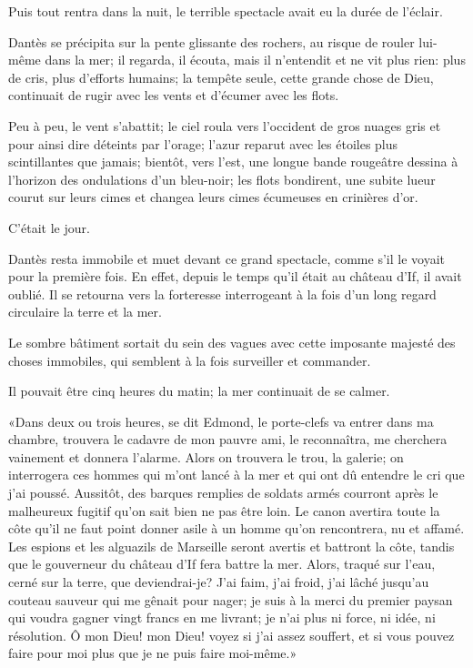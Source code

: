 Puis tout rentra dans la nuit, le terrible spectacle avait eu la durée de l'éclair.

Dantès se précipita sur la pente glissante des rochers, au risque de rouler lui-même dans la mer; il regarda, il écouta, mais il n'entendit et ne vit plus rien: plus de cris, plus d'efforts humains; la tempête seule, cette grande chose de Dieu, continuait de rugir avec les vents et d'écumer avec les flots.

Peu à peu, le vent s'abattit; le ciel roula vers l'occident de gros nuages gris et pour ainsi dire déteints par l'orage; l'azur reparut avec les étoiles plus scintillantes que jamais; bientôt, vers l'est, une longue bande rougeâtre dessina à l'horizon des ondulations d'un bleu-noir; les flots bondirent, une subite lueur courut sur leurs cimes et changea leurs cimes écumeuses en crinières d'or.

C'était le jour.

Dantès resta immobile et muet devant ce grand spectacle, comme s'il le voyait pour la première fois. En effet, depuis le temps qu'il était au château d'If, il avait oublié. Il se retourna vers la forteresse interrogeant à la fois d'un long regard circulaire la terre et la mer.

Le sombre bâtiment sortait du sein des vagues avec cette imposante majesté des choses immobiles, qui semblent à la fois surveiller et commander.

Il pouvait être cinq heures du matin; la mer continuait de se calmer.

«Dans deux ou trois heures, se dit Edmond, le porte-clefs va entrer dans ma chambre, trouvera le cadavre de mon pauvre ami, le reconnaîtra, me cherchera vainement et donnera l'alarme. Alors on trouvera le trou, la galerie; on interrogera ces hommes qui m'ont lancé à la mer et qui ont dû entendre le cri que j'ai poussé. Aussitôt, des barques remplies de soldats armés courront après le malheureux fugitif qu'on sait bien ne pas être loin. Le canon avertira toute la côte qu'il ne faut point donner asile à un homme qu'on rencontrera, nu et affamé. Les espions et les alguazils de Marseille seront avertis et battront la côte, tandis que le gouverneur du château d'If fera battre la mer. Alors, traqué sur l'eau, cerné sur la terre, que deviendrai-je? J'ai faim, j'ai froid, j'ai lâché jusqu'au couteau sauveur qui me gênait pour nager; je suis à la merci du premier paysan qui voudra gagner vingt francs en me livrant; je n'ai plus ni force, ni idée, ni résolution. Ô mon Dieu! mon Dieu! voyez si j'ai assez souffert, et si vous pouvez faire pour moi plus que je ne puis faire moi-même.»


